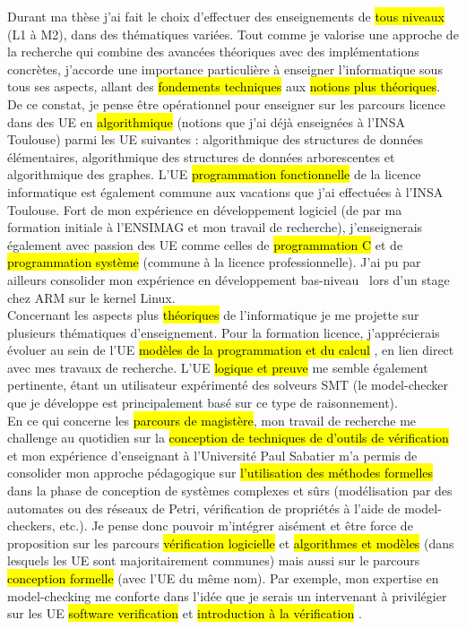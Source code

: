 \label{sec:projet_enseignement}
\vspace{10pt}

Durant ma thèse j'ai fait le choix d'effectuer des enseignements de \hl{tous
niveaux} (L1 à M2), dans des thématiques variées. Tout comme je valorise une
approche de la recherche qui combine des avancées théoriques avec des
implémentations concrètes, j'accorde une importance particulière à enseigner
l'informatique sous tous ses aspects, allant des \hl{fondements techniques} aux
\hl{notions plus théoriques}.\\

De ce constat, je pense être opérationnel pour enseigner sur les parcours
licence dans des UE en \hl{algorithmique} (notions que j'ai déjà enseignées à
l'INSA Toulouse) parmi les UE suivantes : algorithmique des structures de
données élémentaires, algorithmique des structures de données arborescentes et
algorithmique des graphes. L'UE \og \hl{programmation fonctionnelle} \fg de la
licence informatique est également commune aux vacations que j'ai
effectuées à l'INSA Toulouse. Fort de mon expérience en développement logiciel
(de par ma formation initiale à l'ENSIMAG et mon travail de recherche),
j’enseignerais également avec passion des UE comme celles de \hl{programmation
C} et de \hl{programmation système} (commune à la licence professionnelle). J'ai
pu par ailleurs consolider mon expérience en développement \og bas-niveau\ \fg
lors d'un stage chez ARM sur le kernel Linux.\\

Concernant les aspects plus \hl{théoriques} de l'informatique je me projette sur
plusieurs thématiques d'enseignement. Pour la formation licence, j’apprécierais
évoluer au sein de l'UE \og \hl{modèles de la programmation et du calcul} \fg, en lien
direct avec mes travaux de recherche. L'UE \og \hl{logique et preuve} \fg me
semble également pertinente, étant un utilisateur expérimenté des solveurs SMT
(le model-checker que je développe est principalement basé sur ce type de
raisonnement).\\

En ce qui concerne les \hl{parcours de magistère}, mon travail de recherche me
challenge au quotidien sur la \hl{conception de techniques de d'outils de
vérification} et mon expérience d'enseignant à l'Université Paul Sabatier m'a
permis de consolider mon approche pédagogique sur \hl{l'utilisation des méthodes
formelles} dans la phase de conception de systèmes complexes et
sûrs (modélisation par des automates ou des réseaux de Petri, vérification de
propriétés à l'aide de model-checkers, etc.). Je pense donc pouvoir m'intégrer
aisément et être force de proposition sur les parcours \hl{vérification
logicielle} et \hl{algorithmes et modèles} (dans lesquels les UE sont
majoritairement communes) mais aussi sur le parcours \hl{conception formelle} (avec l'UE du même nom).
Par exemple, mon expertise en model-checking me conforte dans l'idée que je
serais un intervenant à privilégier sur les UE \og \hl{software verification} \fg
et \og \hl{introduction à la vérification} \fg.\\

